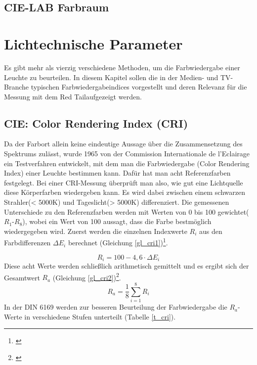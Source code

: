 \section{CIE-LAB Farbraum} \label{sec_lab}

\chapter{Lichtechnische Parameter}
Es gibt mehr als vierzig verschiedene Methoden, um die Farbwiedergabe einer Leuchte zu beurteilen. In diesem Kapitel sollen die in der Medien- und TV-Branche typischen Farbwiedergabeindices vorgestellt und deren Relevanz für die Messung mit dem \glqq Red Tail\grqq  aufgezeigt werden.

\section{CIE: Color Rendering Index (CRI)} \label{sec_cri}

Da der Farbort allein keine eindeutige Aussage über die Zusammensetzung des Spektrums zulässt, wurde 1965 von der Commission Internationale de l'Eclairage ein Testverfahren entwickelt, mit dem man die Farbwiedergabe (Color Rendering Index) einer Leuchte bestimmen kann. Dafür hat man acht Referenzfarben festgelegt. Bei einer CRI-Messung überprüft man also, wie gut eine Lichtquelle diese Körperfarben wiedergeben kann. Es wird dabei zwischen einem schwarzen Strahler(< 5000K) und Tageslicht(> 5000K) differenziert. Die gemessenen Unterschiede zu den Referenzfarben werden mit Werten von 0 bis 100 gewichtet($R_{1}$-$R_{8}$), wobei ein Wert von 100 aussagt, dass die Farbe bestmöglich wiedergegeben wird. Zuerst werden die einzelnen Indexwerte $R_{i}$ aus den Farbdifferenzen $\Delta E_{i}$ berechnet (Gleichung \ref{gl_cri1})\footnote{\cite{davis_ohno}}.

	\begin{equation}\label{gl_cri1}
		R_{i} = 100 - 4,6 \cdot \Delta E_{i}
	\end{equation}
Diese acht Werte werden schließlich arithmetisch gemittelt und es ergibt sich der Gesamtwert $R_{a}$ (Gleichung \ref{gl_cri2})\footnote{\cite{production partner}}.
	\begin{equation}\label{gl_cri2}
		R_{a} =\frac{1}{8} \sum_{i=1}^{8} R_{i}
	\end{equation}
In der DIN 6169 werden zur besseren Beurteilung der Farbwiedergabe die $R_{a}$-Werte in verschiedene Stufen unterteilt (Tabelle \ref{t_cri}).

